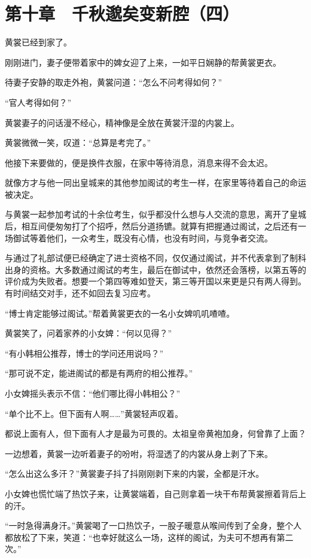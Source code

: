 \section{第十章　千秋邈矣变新腔（四）}

黄裳已经到家了。

刚刚进门，妻子便带着家中的婢女迎了上来，一如平日娴静的帮黄裳更衣。

待妻子安静的取走外袍，黄裳问道：“怎么不问考得如何？”

“官人考得如何？”

黄裳妻子的问话漫不经心，精神像是全放在黄裳汗湿的内裳上。

黄裳微微一笑，叹道：“总算是考完了。”

他接下来要做的，便是换件衣服，在家中等待消息，消息来得不会太迟。

就像方才与他一同出皇城来的其他参加阁试的考生一样，在家里等待着自己的命运被决定。

与黄裳一起参加考试的十余位考生，似乎都没什么想与人交流的意思，离开了皇城后，相互间便匆匆打了个招呼，然后分道扬镳。就算有把握通过阁试，之后还有一场御试等着他们，一众考生，既没有心情，也没有时间，与竞争者交流。

与通过了礼部试便已经确定了进士资格不同，仅仅通过阁试，并不代表拿到了制科出身的资格。大多数通过阁试的考生，最后在御试中，依然还会落榜，以第五等的评价成为失败者。想要一个第四等难如登天，第三等开国以来更是只有两人得到。有时间结交对手，还不如回去复习应考。

“博士肯定能够过阁试。”帮着黄裳更衣的一名小女婢叽叽喳喳。

黄裳笑了，问着家养的小女婢：“何以见得？”

“有小韩相公推荐，博士的学问还用说吗？”

“那可说不定，能进阁试的都是有两府的相公推荐。”

小女婢摇头表示不信：“他们哪比得小韩相公？”

“单个比不上。但下面有人啊……”黄裳轻声叹着。

都说上面有人，但下面有人才是最为可畏的。太祖皇帝黄袍加身，何曾靠了上面？

一边想着，黄裳一边听着妻子的吩咐，将湿透了的内裳从身上剥了下来。

“怎么出这么多汗？”黄裳妻子抖了抖刚刚剥下来的内裳，全都是汗水。

小女婢也慌忙端了热饮子来，让黄裳端着，自己则拿着一块干布帮黄裳擦着背后上的汗。

“一时急得满身汗。”黄裳喝了一口热饮子，一股子暖意从喉间传到了全身，整个人都放松了下来，笑道：“也幸好就这么一场，这样的阁试，为夫可不想再有第二次。”

